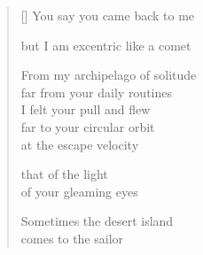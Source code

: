 \documentclass[11pt,a4paper]{article}
\begin{document}
\thispagestyle{empty}


\settowidth{\versewidth}{From my archipelago of solitude}

\bigskip

\begin{verse}[\versewidth]
  You say you came back to me

  but I am excentric like a comet

  From my archipelago of solitude \\
  far from your daily routines\\
  I felt your pull and flew\\
  far to your circular orbit\\
  at the escape velocity

  that of the light \\
  of your gleaming eyes

  Sometimes the desert island \\
  comes to the sailor
\end{verse}
\end{document}
